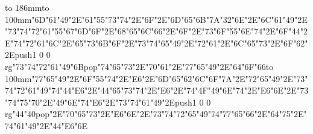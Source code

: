 \hbox to 186mm{\hsize=81mm\vbox to 100mm{\vfill\ipa\char"6D\ipa\char"61\ipa\char"49\ipa\char"2E\ipa\char"61\ipa\char"55\ipa\char"73\ipa\char"74\ipa\char"2E\ipa\char"6F\ipa\char"2E\ipa\char"6D\ipa\char"65\ipa\char"6B\medskip\ipa\char"7A\ipa\char"32\ipa\char"6E\ipa\char"2E\ipa\char"6C\ipa\char"61\ipa\char"49\ipa\char"2E\ipa\char"73\ipa\char"74\ipa\char"72\ipa\char"61\ipa\char"55\ipa\char"67\medskip\ipa\char"6D\ipa\char"6F\ipa\char"2E\ipa\char"68\ipa\char"65\ipa\char"6C\ipa\char"66\ipa\char"2E\ipa\char"6F\ipa\char"2E\ipa\char"73\ipa\char"6F\ipa\char"55\ipa\char"6E\ipa\char"74\ipa\char"2E\ipa\char"6F\ipa\char"44\ipa\char"2E\ipa\char"74\ipa\char"72\ipa\char"61\ipa\char"6C\ipa\char"2E\ipa\char"65\ipa\char"73\ipa\char"6B\medskip\ipa\char"6F\ipa\char"2E\ipa\char"73\ipa\char"74\ipa\char"65\ipa\char"49\ipa\char"2E\ipa\char"72\ipa\char"61\ipa\char"2E\ipa\char"6C\ipa\char"65\ipa\char"73\ipa\char"2E\ipa\char"6F\ipa\char"62\ipa\char"2E\pdfcolorstack\match push{1 0 0 rg}\ipa\char"73\ipa\char"74\ipa\char"72\ipa\char"61\ipa\char"49\ipa\char"6B\pdfcolorstack\match pop{}\medskip\ipa\char"74\ipa\char"65\ipa\char"73\ipa\char"2E\ipa\char"70\ipa\char"61\ipa\char"2E\ipa\char"77\ipa\char"65\ipa\char"49\ipa\char"2E\ipa\char"64\ipa\char"6F\ipa\char"66\vfill}\hfill\vbox to 100mm{\vfill\ipa\char"77\ipa\char"65\ipa\char"49\ipa\char"2E\ipa\char"6F\ipa\char"55\ipa\char"74\ipa\char"2E\ipa\char"E6\ipa\char"2E\ipa\char"6D\ipa\char"65\ipa\char"62\medskip\ipa\char"6C\ipa\char"6F\ipa\char"7A\ipa\char"2E\ipa\char"72\ipa\char"65\ipa\char"49\ipa\char"2E\ipa\char"73\ipa\char"74\ipa\char"72\ipa\char"61\ipa\char"49\ipa\char"74\medskip\ipa\char"44\ipa\char"E6\ipa\char"2E\ipa\char"44\ipa\char"65\ipa\char"73\ipa\char"74\ipa\char"2E\ipa\char"E6\ipa\char"2E\ipa\char"74\ipa\char"4F\ipa\char"49\ipa\char"6E\ipa\char"74\ipa\char"2E\ipa\char"E6\ipa\char"6E\ipa\char"2E\ipa\char"73\ipa\char"74\ipa\char"75\ipa\char"70\ipa\char"2E\ipa\char"49\ipa\char"6E\ipa\char"74\medskip\ipa\char"E6\ipa\char"2E\ipa\char"73\ipa\char"74\ipa\char"61\ipa\char"49\ipa\char"2E\pdfcolorstack\match push{1 0 0 rg}\ipa\char"44\ipa\char"40\pdfcolorstack\match pop{}\ipa\char"2E\ipa\char"70\ipa\char"65\ipa\char"73\ipa\char"2E\ipa\char"E6\ipa\char"6E\ipa\char"2E\ipa\char"73\ipa\char"74\ipa\char"72\ipa\char"65\ipa\char"49\ipa\char"74\medskip\ipa\char"77\ipa\char"65\ipa\char"66\ipa\char"2E\ipa\char"64\ipa\char"75\ipa\char"2E\ipa\char"74\ipa\char"61\ipa\char"49\ipa\char"2E\ipa\char"44\ipa\char"E6\ipa\char"6E\vfill}}\eject
